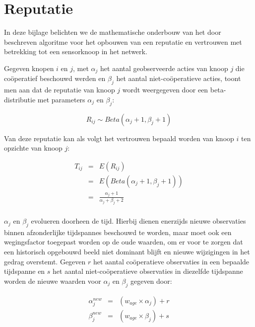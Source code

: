 
\chapter{Reputatie}
\label{appendix:reputation}

In deze bijlage belichten we de mathematische onderbouw van het door
\citep{ganeriwal2008reputation} beschreven algoritme voor het opbouwen van
een reputatie en vertrouwen met betrekking tot een sensorknoop in het netwerk.

Gegeven knopen $i$ en $j$, met $\alpha_j$ het aantal geobserveerde acties van
knoop $j$ die co\"operatief beschouwd werden en $\beta_j$ het aantal
niet-co\"operatieve acties, toont men aan dat de reputatie van knoop $j$ wordt
weergegeven door een beta-distributie met parameters $\alpha_j$ en $\beta_j$:

\begin{equation} \label{eq:reputation-beta}
R_{ij} \sim Beta(\alpha_j+1, \beta_j+1)
\end{equation}

Van deze reputatie kan als volgt het vertrouwen bepaald worden van knoop $i$
ten opzichte van knoop $j$:

\begin{equation} \label{eq:reputation-trust}
\begin{array}{rcl}
T_{ij} & = & E(R_{ij}) \\
       & = & E(Beta(\alpha_j+1, \beta_j+1)) \\
       & = & \frac{\alpha_j+1}{\alpha_j+\beta_j+2} \\
\end{array}
\end{equation}

$\alpha_j$ en $\beta_j$ evolueren doorheen de tijd. Hierbij dienen enerzijds
nieuwe observaties binnen afzonderlijke tijdspannes beschouwd te worden, maar
moet ook een wegingsfactor toegepast worden op de oude waarden, om er voor te
zorgen dat een historisch opgebouwd beeld niet dominant blijft en nieuwe
wijzigingen in het gedrag overstemt. Gegeven $r$ het aantal co\"operatieve
observaties in een bepaalde tijdspanne en $s$ het aantal niet-co\"operatieve
observaties in diezelfde tijdspanne worden de nieuwe waarden voor $\alpha_j$ en
$\beta_j$ gegeven door:

\begin{equation} \label{eq:reputation-update-direct}
\begin{array}{rcl}
\alpha^{new}_j & = & (w_{age} \times \alpha_j) + r \\
\beta^{new}_j  & = & (w_{age} \times \beta_j) + s \\
\end{array}
\end{equation}

